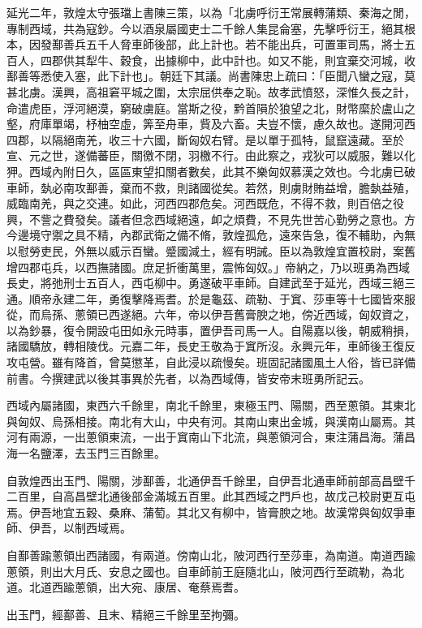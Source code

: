 \begin{pinyinscope}
延光二年，敦煌太守張璫上書陳三策，以為「北虜呼衍王常展轉蒲類、秦海之閒，專制西域，共為寇鈔。今以酒泉屬國吏士二千餘人集昆侖塞，先擊呼衍王，絕其根本，因發鄯善兵五千人脅車師後部，此上計也。若不能出兵，可置軍司馬，將士五百人，四郡供其犁牛、穀食，出據柳中，此中計也。如又不能，則宜棄交河城，收鄯善等悉使入塞，此下計也」。朝廷下其議。尚書陳忠上疏曰：「臣聞八蠻之寇，莫甚北虜。漢興，高祖窘平城之圍，太宗屈供奉之恥。故孝武憤怒，深惟久長之計，命遣虎臣，浮河絕漠，窮破虜庭。當斯之役，黔首隕於狼望之北，財幣縻於盧山之壑，府庫單竭，杼柚空虛，筭至舟車，貲及六畜。夫豈不懷，慮久故也。遂開河西四郡，以隔絕南羌，收三十六國，斷匈奴右臂。是以單于孤特，鼠竄遠藏。至於宣、元之世，遂備蕃臣，關徼不閉，羽檄不行。由此察之，戎狄可以威服，難以化狎。西域內附日久，區區東望扣關者數矣，此其不樂匈奴慕漢之效也。今北虜已破車師，埶必南攻鄯善，棄而不救，則諸國從矣。若然，則虜財賄益增，膽埶益殖，威臨南羌，與之交連。如此，河西四郡危矣。河西既危，不得不救，則百倍之役興，不訾之費發矣。議者但念西域絕遠，卹之煩費，不見先世苦心勤勞之意也。方今邊境守禦之具不精，內郡武衛之備不脩，敦煌孤危，遠來告急，復不輔助，內無以慰勞吏民，外無以威示百蠻。蹙國減土，經有明誡。臣以為敦煌宜置校尉，案舊增四郡屯兵，以西撫諸國。庶足折衝萬里，震怖匈奴。」帝納之，乃以班勇為西域長史，將弛刑士五百人，西屯柳中。勇遂破平車師。自建武至于延光，西域三絕三通。順帝永建二年，勇復擊降焉耆。於是龜茲、疏勒、于窴、莎車等十七國皆來服從，而烏孫、蔥領已西遂絕。六年，帝以伊吾舊膏腴之地，傍近西域，匈奴資之，以為鈔暴，復令開設屯田如永元時事，置伊吾司馬一人。自陽嘉以後，朝威稍損，諸國驕放，轉相陵伐。元嘉二年，長史王敬為于窴所沒。永興元年，車師後王復反攻屯營。雖有降首，曾莫懲革，自此浸以疏慢矣。班固記諸國風土人俗，皆已詳備前書。今撰建武以後其事異於先者，以為西域傳，皆安帝末班勇所記云。

西域內屬諸國，東西六千餘里，南北千餘里，東極玉門、陽關，西至蔥領。其東北與匈奴、烏孫相接。南北有大山，中央有河。其南山東出金城，與漢南山屬焉。其河有兩源，一出蔥領東流，一出于窴南山下北流，與蔥領河合，東注蒲昌海。蒲昌海一名鹽澤，去玉門三百餘里。

自敦煌西出玉門、陽關，涉鄯善，北通伊吾千餘里，自伊吾北通車師前部高昌壁千二百里，自高昌壁北通後部金滿城五百里。此其西域之門戶也，故戊己校尉更互屯焉。伊吾地宜五穀、桑麻、蒲萄。其北又有柳中，皆膏腴之地。故漢常與匈奴爭車師、伊吾，以制西域焉。

自鄯善踰蔥領出西諸國，有兩道。傍南山北，陂河西行至莎車，為南道。南道西踰蔥領，則出大月氏、安息之國也。自車師前王庭隨北山，陂河西行至疏勒，為北道。北道西踰蔥領，出大宛、康居、奄蔡焉耆。

出玉門，經鄯善、且末、精絕三千餘里至拘彌。


\end{pinyinscope}
